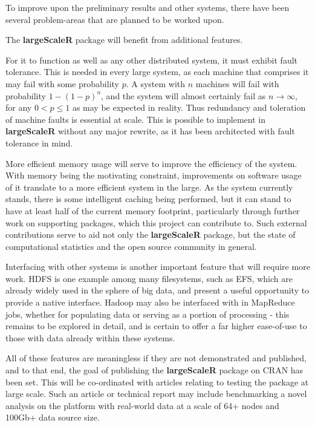 To improve upon the preliminary results and other systems, there have been several problem-areas that are planned to be worked upon.

The \textbf{largeScaleR} package will benefit from additional features.

For it to function as well as any other distributed system, it must exhibit fault tolerance.
This is needed in every large system, as each machine that comprises it may fail with some probability \(p\).
A system with \(n\) machines will fail with probability \(1-(1-p)^n\), and the system will almost certainly fail as \(n \to \infty\), for any \(0 < p \leq 1\) as may be expected in reality.
Thus redundancy and toleration of machine faults is essential at scale.
This is possible to implement in \textbf{largeScaleR} without any major rewrite, as it has been architected with fault tolerance in mind.

More efficient memory usage will serve to improve the efficiency of the system.
With memory being the motivating constraint, improvements on software usage of it translate to a more efficient system in the large.
As the system currently stands, there is some intelligent caching being performed, but it can stand to have at least half of the current memory footprint, particularly through further work on supporting packages, which this project can contribute to.
Such external contributions serve to aid not only the \textbf{largeScaleR} package, but the state of computational statistics and the open source community in general.

Interfacing with other systems is another important feature that will require more work.
HDFS is one example among many filesystems, such as EFS, which are already widely used in the sphere of big data, and present a useful opportunity to provide a native interface.
Hadoop may also be interfaced with in MapReduce jobs, whether for populating data or serving as a portion of processing - this remains to be explored in detail, and is certain to offer a far higher ease-of-use to those with data already within these systems.

All of these features are meaningless if they are not demonstrated and published, and to that end, the goal of publishing the \textbf{largeScaleR} package on CRAN has been set.
This will be co-ordinated with articles relating to testing the package at large scale.
Such an article or technical report may include benchmarking a novel analysis on the platform with real-world data at a scale of 64+ nodes and 100Gb+ data source size.
